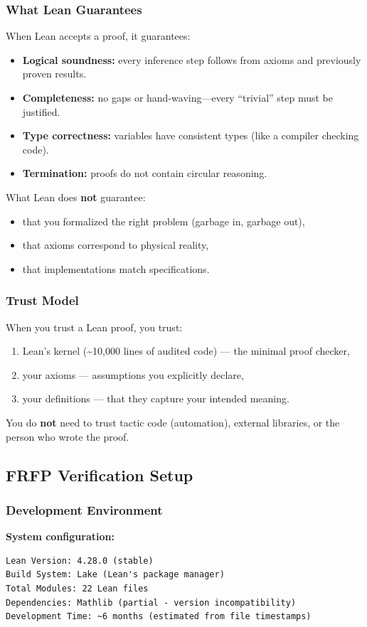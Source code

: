 \subsubsection{What Lean Guarantees}
When Lean accepts a proof, it guarantees:
\begin{itemize}
  \item \textbf{Logical soundness:} every inference step follows from axioms and previously proven results.
  \item \textbf{Completeness:} no gaps or hand-waving—every ``trivial'' step must be justified.
  \item \textbf{Type correctness:} variables have consistent types (like a compiler checking code).
  \item \textbf{Termination:} proofs do not contain circular reasoning.
\end{itemize}

\noindent What Lean does \textbf{not} guarantee:
\begin{itemize}
  \item that you formalized the right problem (garbage in, garbage out),
  \item that axioms correspond to physical reality,
  \item that implementations match specifications.
\end{itemize}

\subsubsection{Trust Model}
When you trust a Lean proof, you trust:
\begin{enumerate}
  \item Lean's kernel (\textasciitilde 10{,}000 lines of audited code) — the minimal proof checker,
  \item your axioms — assumptions you explicitly declare,
  \item your definitions — that they capture your intended meaning.
\end{enumerate}
You do \textbf{not} need to trust tactic code (automation), external libraries, or the person who wrote the proof.

\subsection{FRFP Verification Setup}

\subsubsection{Development Environment}
\textbf{System configuration:}
\begin{verbatim}
Lean Version: 4.28.0 (stable)
Build System: Lake (Lean's package manager)
Total Modules: 22 Lean files
Dependencies: Mathlib (partial - version incompatibility)
Development Time: ~6 months (estimated from file timestamps)
\end{verbatim}

